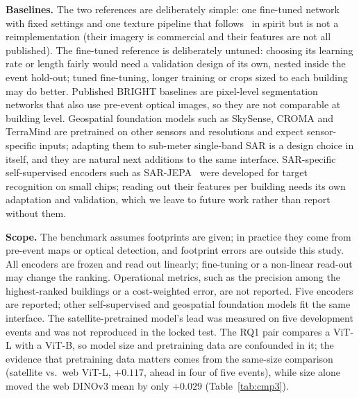 \documentclass[journal]{IEEEtran}
\begin{document}
\textbf{Baselines.} The two references are deliberately simple: one fine-tuned network with fixed settings and one texture pipeline that follows~\cite{macchiarulo2025sar} in spirit but is not a reimplementation (their imagery is commercial and their features are not all published). The fine-tuned reference is deliberately untuned: choosing its learning rate or length fairly would need a validation design of its own, nested inside the event hold-out; tuned fine-tuning, longer training or crops sized to each building may do better. Published BRIGHT baselines are pixel-level segmentation networks that also use pre-event optical images, so they are not comparable at building level. Geospatial foundation models such as SkySense, CROMA and TerraMind are pretrained on other sensors and resolutions and expect sensor-specific inputs; adapting them to sub-meter single-band SAR is a design choice in itself, and they are natural next additions to the same interface. SAR-specific self-supervised encoders such as SAR-JEPA~\cite{li2024sarjepa} were developed for target recognition on small chips; reading out their features per building needs its own adaptation and validation, which we leave to future work rather than report without them.

\textbf{Scope.} The benchmark assumes footprints are given; in practice they come from pre-event maps or optical detection, and footprint errors are outside this study. All encoders are frozen and read out linearly; fine-tuning or a non-linear read-out may change the ranking. Operational metrics, such as the precision among the highest-ranked buildings or a cost-weighted error, are not reported. Five encoders are reported; other self-supervised and geospatial foundation models fit the same interface. The satellite-pretrained model's lead was measured on five development events and was not reproduced in the locked test. The RQ1 pair compares a ViT-L with a ViT-B, so model size and pretraining data are confounded in it; the evidence that pretraining data matters comes from the same-size comparison (satellite vs.\ web ViT-L, $+0.117$, ahead in four of five events), while size alone moved the web DINOv3 mean by only $+0.029$ (Table~\ref{tab:cmp3}).

\end{document}
